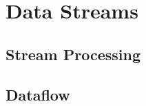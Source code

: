 \chapter{Data Streams}
\label{chapter:streams}


\section{Stream Processing}
\label{sec:stream-processing}


\section{Dataflow}
\label{sec:dataflow-models}

